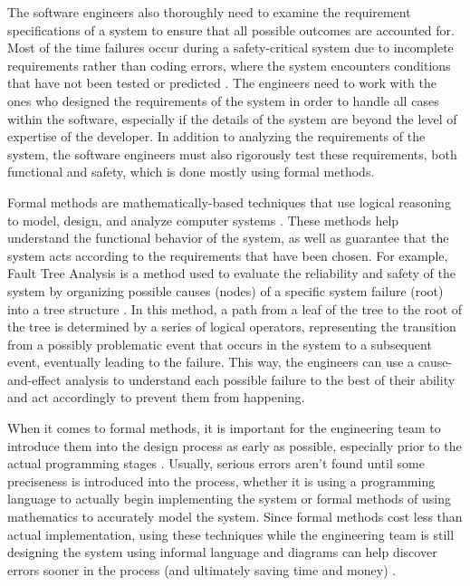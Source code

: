 \documentclass[12pt]{article}
\begin{document}
  The software engineers also thoroughly need to examine the requirement specifications of a system to ensure that all possible outcomes are accounted for. Most of the time failures occur during a safety-critical system due to incomplete requirements rather than coding errors, where the system encounters conditions that have not been tested or predicted \cite{ref2}. The engineers need to work with the ones who designed the requirements of the system in order to handle all cases within the software, especially if the details of the system are beyond the level of expertise of the developer. In addition to analyzing the requirements of the system, the software engineers must also rigorously test these requirements, both functional and safety, which is done mostly using formal methods.

  Formal methods are mathematically-based techniques that use logical reasoning to model, design, and analyze computer systems \cite{ref3}. These methods help understand the functional behavior of the system, as well as guarantee that the system acts according to the requirements that have been chosen. For example, Fault Tree Analysis is a method used to evaluate the reliability and safety of the system by organizing possible causes (nodes) of a specific system failure (root) into a tree structure \cite{ref3}. In this method, a path from a leaf of the tree to the root of the tree is determined by a series of logical operators, representing the transition from a possibly problematic event that occurs in the system to a subsequent event, eventually leading to the failure. This way, the engineers can use a cause-and-effect analysis to understand each possible failure to the best of their ability and act accordingly to prevent them from happening.

  When it comes to formal methods, it is important for the engineering team to introduce them into the design process as early as possible, especially prior to the actual programming stages \cite{ref1}. Usually, serious errors aren't found until some preciseness is introduced into the process, whether it is using a programming language to actually begin implementing the system or formal methods of using mathematics to accurately model the system. Since formal methods cost less than actual implementation, using these techniques while the engineering team is still designing the system using informal language and diagrams can help discover errors sooner in the process (and ultimately saving time and money) \cite{ref1}. 
\end{document}
